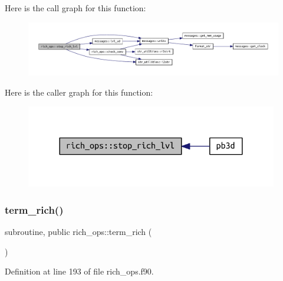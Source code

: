 Here is the call graph for this function\+:
\nopagebreak
\begin{figure}[H]
\begin{center}
\leavevmode
\includegraphics[width=350pt]{namespacerich__ops_a56eae87ecc82010895d63b45a16e6106_cgraph}
\end{center}
\end{figure}
Here is the caller graph for this function\+:
\nopagebreak
\begin{figure}[H]
\begin{center}
\leavevmode
\includegraphics[width=312pt]{namespacerich__ops_a56eae87ecc82010895d63b45a16e6106_icgraph}
\end{center}
\end{figure}
\mbox{\label{namespacerich__ops_a3cf72a3ed0806ac9ddff262a00b2e33d}} 
\subsubsection{\texorpdfstring{term\+\_\+rich()}{term\_rich()}}
{\footnotesize\ttfamily subroutine, public rich\+\_\+ops\+::term\+\_\+rich (\begin{DoxyParamCaption}{ }\end{DoxyParamCaption})}



Definition at line 193 of file rich\+\_\+ops.\+f90.

